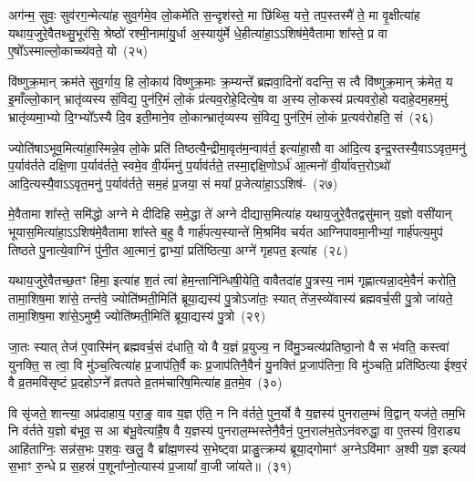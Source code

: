 {\anuvakamend[{इत्ये॒तद॑वभृ॒थो दिशः॑ स॒प्त च॑}]}%

अग॑न्म॒ सुवः॒ सुव॑रग॒न्मेत्या॑ह सुव॒र्गमे॒व लो॒कमे॑ति स॒न्दृश॑स्ते॒ मा छि॑थ्सि॒ यत्ते॒ तप॒स्तस्मै॑ ते॒ मा वृ॒क्षीत्या॑ह यथाय॒जुरे॒वैतथ्सु॒भूर॑सि॒ श्रेष्ठो॑ रश्मी॒नामा॑यु॒र्धा अ॒स्यायु॑र्मे धे॒हीत्या॑हा॒\-ऽ\-ऽशिष॑मे॒वैतामा शा᳚स्ते॒ प्र वा ए॒षो᳚\-ऽस्माल्लो॒काच्च्य॑वते॒ यो~(२५)

वि॑ष्णुक्र॒मान् क्रम॑ते सुव॒र्गाय॒ हि लो॒काय॑ विष्णुक्र॒माः क्र॒म्यन्ते᳚ ब्रह्मवा॒दिनो॑ वदन्ति॒ स त्वै वि॑ष्णुक्र॒मान् क्र॑मेत॒ य इ॒माँल्लो॒कान् भ्रातृ॑व्यस्य सं॒विद्य॒ पुन॑रि॒मं लो॒कं प्र॑त्यव॒रोहे॒दित्ये॒ष वा अ॒स्य लो॒कस्य॑ प्रत्यवरो॒हो यदाहे॒दम॒हम॒मुं भ्रातृ॑व्यमा॒भ्यो दि॒ग्भ्यो᳚\-ऽस्यै दि॒व इती॒माने॒व लो॒कान्भ्रातृ॑व्यस्य सं॒विद्य॒ पुन॑रि॒मं लो॒कं प्र॒त्यव॑रोहति॒ सं~(२६)

ज्योति॑षा\-ऽभूव॒मित्या॑हा॒स्मिन्ने॒व लो॒के प्रति॑ तिष्ठत्यै॒न्द्रीमा॒\-वृत॑म॒न्वाव॑र्त॒ इत्या॑हा॒सौ वा आ॑दि॒त्य इन्द्र॒स्तस्यै॒वा\-ऽ\-ऽ\-वृत॒मनु॑ प॒र्याव॑र्तते दक्षि॒णा प॒र्याव॑र्तते॒ स्वमे॒व वी॒र्य॑मनु॑ प॒र्याव॑र्तते॒ तस्मा॒द्दक्षि॒णो\-ऽर्ध॑ आ॒त्मनो॑ वी॒र्या॑वत्त॒रो\-ऽथो॑ आदि॒त्यस्यै॒वा\-ऽ\-ऽवृत॒मनु॑ प॒र्याव॑र्तते॒ सम॒हं प्र॒जया॒ सं मया᳚ प्र॒जेत्या॑हा॒\-ऽ\-ऽशिष॑-~(२७)

मे॒वैतामा शा᳚स्ते॒ समि॑द्धो अग्ने मे दीदिहि समे॒द्धा ते॑ अग्ने दीद्यास॒मित्या॑ह यथाय॒जुरे॒वैतद्वसु॑मान् य॒ज्ञो वसी॑यान् भूयास॒मित्या॑हा॒\-ऽ\-ऽशिष॑मे॒वैतामा शा᳚स्ते ब॒हु वै गार्\mbox{}ह॑पत्य॒स्यान्ते॑ मि॒श्रमि॑व चर्यत आग्निपावमा॒नीभ्यां॒ गार्\mbox{}ह॑पत्य॒मुप॑ तिष्ठते पु॒नात्ये॒वाग्निं पु॑नी॒त आ॒त्मानं॒ द्वाभ्यां॒ प्रति॑ष्ठित्या॒ अग्ने॑ गृहपत॒ इत्या॑ह~(२८)

यथाय॒जुरे॒वैतच्छ॒तꣳ हिमा॒ इत्या॑ह श॒तं त्वा॑ हेम॒न्तानि॑न्धिषी॒येति॒ वावैतदा॑ह पु॒त्रस्य॒ नाम॑ गृह्णात्यन्ना॒दमे॒वैनं॑ करोति॒ तामा॒शिष॒मा शा॑से॒ तन्त॑वे॒ ज्योति॑ष्मती॒मिति॑ ब्रूया॒द्यस्य॑ पु॒त्रो\-ऽजा॑तः॒ स्यात् ते॑ज॒स्व्ये॑वास्य॑ ब्रह्मवर्च॒सी पु॒त्रो जा॑यते॒ तामा॒शिष॒मा शा॑से॒\-ऽमुष्मै॒ ज्योति॑ष्मती॒मिति॑ ब्रूया॒द्यस्य॑ पु॒त्रो~(२९)

जा॒तः स्यात् तेज॑ ए॒वास्मि॑न् ब्रह्मवर्च॒सं द॑धाति॒ यो वै य॒ज्ञं प्र॒युज्य॒ न वि॑मु॒ञ्चत्य॑प्रतिष्ठा॒नो वै स भ॑वति॒ कस्त्वा॑ युनक्ति॒ स त्वा॒ वि मु॑ञ्च॒त्वित्या॑ह प्र॒जा\-प॑ति॒र्वै कः प्र॒जा\-प॑तिनै॒वैनं॑ यु॒नक्ति॑ प्र॒जा\-प॑तिना॒ वि मु॑ञ्चति॒ प्रति॑ष्ठित्या ईश्व॒रं वै व्र॒तमवि॑सृष्टं प्र॒दहो\-ऽग्ने᳚ व्रतपते व्र॒तम॑चारिष॒मित्या॑ह व्र॒तमे॒व~(३०)

वि सृ॑जते॒ शान्त्या॒ अप्र॑दाहाय॒ परा॒ङ्॒ वाव य॒ज्ञ ए॑ति॒ न नि व॑र्तते॒ पुन॒र्यो वै य॒ज्ञस्य॑ पुनराल॒म्भं वि॒द्वान् यज॑ते॒ तम॒भि नि व॑र्तते य॒ज्ञो ब॑भूव॒ स आ ब॑भू॒वेत्या॑है॒ष वै य॒ज्ञस्य॑ पुनराल॒म्भस्तेनै॒वैनं॒ पुन॒राल॑भ॒ते\-ऽन॑वरुद्धा॒ वा ए॒तस्य॑ वि॒राड्य आहि॑ताग्निः॒ सन्न॑स॒भः प॒शवः॒ खलु॒ वै ब्रा᳚ह्म॒णस्य॑ स॒भेष्ट्वा प्राङु॒त्क्रम्य॑ ब्रूया॒द्गोमाꣳ॑ अ॒ग्ने\-ऽवि॑माꣳ अ॒श्वी य॒ज्ञ इत्यव॑ स॒भाꣳ रु॒न्धे प्र स॒हस्रं॑ प॒शूना᳚प्नो॒त्यास्य॑ प्र॒जायां᳚ वा॒जी जा॑यते॥~(३१)

